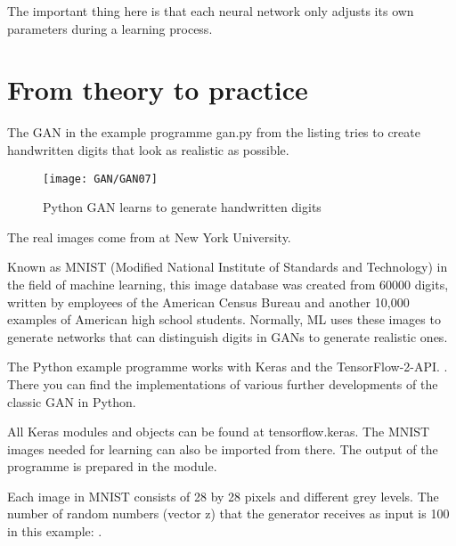 \medskip


The important thing here is that each neural network only adjusts its own parameters during a learning process.

\section{From theory to practice}

The GAN in the example programme gan.py from the listing tries to create handwritten digits that look as realistic as possible.

\begin{figure}
	\texttt{[image: GAN/GAN07]}
	\caption{Python GAN learns to generate handwritten digits} 
	\label{GAN07}
\end{figure}

The real images come from   at New York University.

\begin{code}
	
	\caption{File } \label{code:gan}    
\end{code}    


Known as MNIST (Modified National Institute of Standards and Technology) in the field of machine learning, this image database was created from 60000 digits, written by employees of the American Census Bureau and another 10,000 examples of American high school students. Normally, ML uses these images to generate networks that can distinguish digits in GANs to generate realistic ones.

The Python example programme works with Keras and the TensorFlow-2-API.  . There you can find the implementations of various further developments of the classic GAN in Python.

All Keras modules and objects can be found at tensorflow.keras. The MNIST images needed for learning can also be imported from there. The output of the programme is prepared in the   module.

Each image in MNIST consists of 28 by 28 pixels and different grey levels. The number of random numbers (vector z) that the generator receives as input is 100 in this example: .

